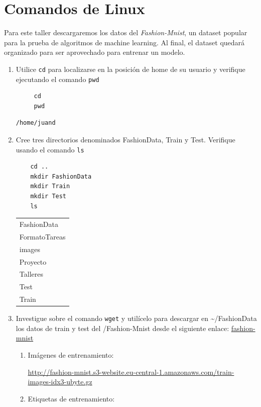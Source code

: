 \documentclass{article}
\begin{document}
\section{Comandos de Linux}
\label{sec:org7d800b5}
Para este taller descargaremos los datos del \emph{Fashion-Mnist}, un
dataset popular para la prueba de algoritmos de machine learning. Al
final, el dataset quedará organizado para ser aprovechado para
entrenar un modelo.

\begin{enumerate}
\item Utilice \texttt{cd} para localizarse en la posición de home de su usuario y
verifique ejecutando el comando \texttt{pwd}

\begin{verbatim}
     cd
     pwd
\end{verbatim}

\label{org6b4ae11}
\begin{verbatim}
/home/juand
\end{verbatim}

\item Cree tres directorios denominados FashionData, Train y
Test. Verifique usando el comando \texttt{ls}
\begin{verbatim}
    cd ..
    mkdir FashionData
    mkdir Train
    mkdir Test
    ls
\end{verbatim}

\begin{table}[htbp]
\label{tab:org4a6f48f}
\centering
\begin{tabular}{l}
FashionData\\
FormatoTareas\\
images\\
Proyecto\\
Talleres\\
Test\\
Train\\
\end{tabular}
\end{table}

\item Investigue sobre el comando \texttt{wget} y utilícelo para descargar en
\textasciitilde{}/FashionData los datos de train y test del /Fashion-Mnist desde el
siguiente enlace: \href{https://github.com/zalandoresearch/fashion-mnist}{fashion-mnist}
\begin{enumerate}
\item Imágenes de entrenamiento:

\url{http://fashion-mnist.s3-website.eu-central-1.amazonaws.com/train-images-idx3-ubyte.gz}
\item Etiquetas de entrenamiento:


\end{enumerate}
\end{enumerate}
\end{document}
